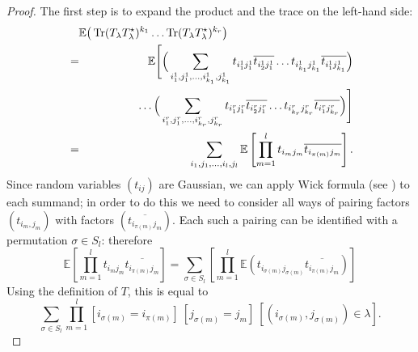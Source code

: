 \documentclass[12pt]{amsart}
\theoremstyle{plain}
\theoremstyle{remark}
\newcommand{\E}{\mathbb{E}}
\DeclareMathOperator{\Tr}{Tr}
\begin{document}
\begin{proof}
The first step is to expand the product and the trace on the left-hand side:
\begin{eqnarray*}
\E\big(\Tr(T_\lambda T_\lambda^\star)^{k_1} \ldots \Tr(T_\lambda T_\lambda^\star)^{k_r} \big) \hspace{-5cm}\\
&=&\E\Bigg[ \Big(\sum_{i^1_1,j^1_1,\ldots,i^1_{k_1},j^1_{k_1}} t_{i^1_1 j^1_1}
\overline{t_{i^1_2 j^1_1}} \ldots t_{i^1_{k_1} j^1_{k_1}} \overline{t_{i^1_1
j^1_{k_1}}} \Big)\\
& &\hspace{1,5cm} \ldots \Big(\sum_{i^r_1,j^r_1,\ldots,i^r_{k_r},j^r_{k_r}}
t_{i^r_1 j^r_1} \overline{t_{i^r_2 j^r_1}} \ldots t_{i^r_{k_r} j^r_{k_r}}
\overline{t_{i^r_1 j^r_{k_r}}} \Big) \Bigg]\\
&= &
\sum_{i_1,j_1,\ldots,i_l,j_l} \E\left[
\prod_{m=1}^l t_{i_m j_m} \overline{t_{i_{\pi(m)} j_m}} \right].
\end{eqnarray*}
Since random variables $(t_{ij})$ are Gaussian, we can apply Wick formula (see
\cite{Zvonkin1997}) to each summand; in order to do this we need to consider
all ways of pairing factors $(t_{i_m,j_m})$ with factors
$(\overline{t_{i_{\pi(m)} j_m}})$. Each such a pairing can be identified with a
permutation $\sigma\in S_l$: therefore
$$\E\left[ \prod_{m=1}^l t_{i_m j_m} \overline{t_{i_{\pi(m)}
j_m}} \right]=\sum_{\sigma \in S_l} \left[ \prod_{m=1}^l
\E\left(t_{i_{\sigma(m)} j_{\sigma(m)}} \overline{t_{i_{\pi(m)} j_m}}\right)
\right]$$
Using the definition of $T$, this is equal to
$$
\sum_{\sigma \in S_l} \prod_{m=1}^l  [i_{\sigma(m)}=i_{\pi(m)}] \  [j_{\sigma(m)}=j_m] \
[(i_{\sigma(m)},j_{\sigma(m)}) \in \lambda].
$$


\end{proof}
\end{document}
